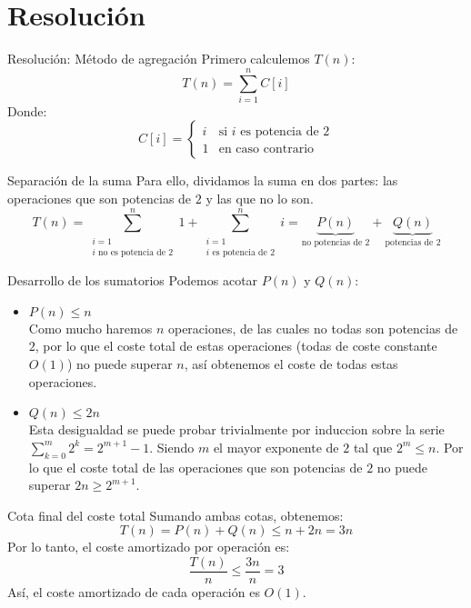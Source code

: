 \documentclass[aspectratio=169]{beamer}
\begin{document}
\section{Resolución}

\begin{frame}{Resolución: Método de agregación}
    Primero calculemos $T(n)$:
    \[
    T(n) = \sum_{i=1}^{n} C[i]
    \]
    Donde:
    \[
    C[i] = 
    \begin{cases}
        i & \text{si } i \text{ es potencia de } 2 \\
        1 & \text{en caso contrario}
    \end{cases}
    \]
\end{frame}

\begin{frame}{Separación de la suma}
    Para ello, dividamos la suma en dos partes: las operaciones que son potencias de $2$ y las que no lo son.
    \[
    T(n) = \sum_{\substack{i=1 \\ i \text{ no es potencia de } 2}}^{n} 1 + \sum_{\substack{i=1 \\ i \text{ es potencia de } 2}}^{n} i = \underbrace{P(n)}_{\text{no potencias de } 2} + \underbrace{Q(n)}_{\text{potencias de } 2}
    \]
\end{frame}

\begin{frame}{Desarrollo de los sumatorios}
    Podemos acotar $P(n)$ y $Q(n)$:
    \begin{itemize}
        \item $P(n) \leq n$ \\
        Como mucho haremos $n$ operaciones, de las cuales no todas son potencias de $2$, por lo que el coste total de estas operaciones (todas de coste constante $O(1)$) no puede superar $n$, así obtenemos el coste de todas estas operaciones.
        \item $Q(n) \leq 2n$ \\
        Esta desigualdad se puede probar trivialmente por induccion sobre la serie $\sum_{k=0}^{m} 2^k = 2^{m+1} - 1$. Siendo $m$ el mayor exponente de $2$ tal que $2^m \leq n$. Por lo que el coste total de las operaciones que son potencias de $2$ no puede superar $2n \geq 2^{m+1}$. 
    \end{itemize}
\end{frame}

\begin{frame}{Cota final del coste total}
    Sumando ambas cotas, obtenemos:
    \[
    T(n) = P(n) + Q(n) \leq n + 2n = 3n
    \]
    Por lo tanto, el coste amortizado por operación es:
    \[
    \frac{T(n)}{n} \leq \frac{3n}{n} = 3
    \]
    Así, el coste amortizado de cada operación es $O(1)$.
\end{frame}
\end{document}
